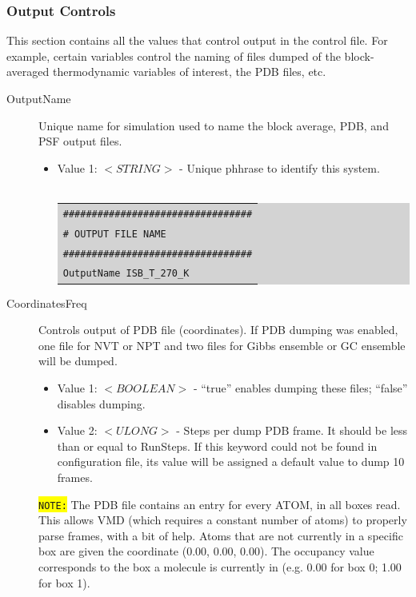 \subsubsection{Output Controls}
This section contains all the values that control output in the control file.  For example, certain variables control the naming of files dumped of the block-averaged thermodynamic variables of interest, the PDB files, etc.
\begin{description}
\item [OutputName] Unique name for simulation used to name the block average, PDB, and PSF output files.
	\begin{itemize}
	\item Value 1: $<STRING>$ - Unique phhrase to identify this system.\\\\
	\colorbox{lightgray}{
	\begin{tabular}{l}
	\texttt{\#\#\#\#\#\#\#\#\#\#\#\#\#\#\#\#\#\#\#\#\#\#\#\#\#\#\#\#\#\#\#\#\#}\\
	\texttt{\#  OUTPUT FILE NAME}\\
	\texttt{\#\#\#\#\#\#\#\#\#\#\#\#\#\#\#\#\#\#\#\#\#\#\#\#\#\#\#\#\#\#\#\#\#}\\
	\texttt{OutputName  ISB\_T\_270\_K}\\
	\end{tabular}}
	\end{itemize}
\item [CoordinatesFreq] Controls output of PDB file (coordinates). If PDB dumping was enabled, one file for NVT or NPT and two files for Gibbs ensemble or GC ensemble will be dumped.
	\begin{itemize}
	\item Value 1: $<BOOLEAN>$ - ``true'' enables dumping these files; ``false'' disables dumping.
	\item Value 2: $<ULONG>$ - Steps per dump PDB frame. It should be less than or equal to RunSteps. If this keyword could not be found in configuration file, its value will be assigned a default value to dump 10 frames.
	\end{itemize}
	\colorbox{yellow}{\texttt{NOTE:}} The PDB file contains an entry for every ATOM, in all boxes read. This allows VMD (which requires a constant number of atoms) to properly parse frames, with a bit of help. Atoms that are not currently in a specific box are given the coordinate (0.00, 0.00, 0.00). The occupancy value corresponds to the box a molecule is currently in (e.g. 0.00 for box 0; 1.00 for box 1).\\\\

\end{description}
